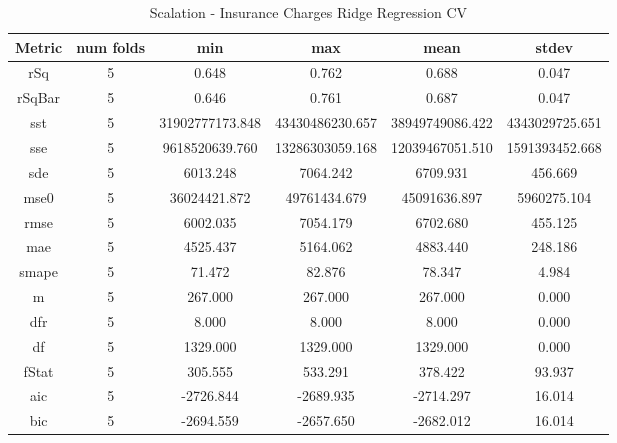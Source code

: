 \documentclass{article}
\begin{document}
\begin{table}[H]
\centering
\caption{Scalation - Insurance Charges Ridge Regression CV}
\label{tab:Scalation - Insurance Charges Ridge Regression CV}
\begin{tabular}{|c|c|c|c|c|c|}\hline
Metric & num folds & min & max & mean & stdev \\ \hline \hline
rSq & 5 & 0.648 & 0.762 & 0.688 & 0.047 \\ \hline
rSqBar & 5 & 0.646 & 0.761 & 0.687 & 0.047 \\ \hline
sst & 5 & 31902777173.848 & 43430486230.657 & 38949749086.422 & 4343029725.651 \\ \hline
sse & 5 & 9618520639.760 & 13286303059.168 & 12039467051.510 & 1591393452.668 \\ \hline
sde & 5 & 6013.248 & 7064.242 & 6709.931 & 456.669 \\ \hline
mse0 & 5 & 36024421.872 & 49761434.679 & 45091636.897 & 5960275.104 \\ \hline
rmse & 5 & 6002.035 & 7054.179 & 6702.680 & 455.125 \\ \hline
mae & 5 & 4525.437 & 5164.062 & 4883.440 & 248.186 \\ \hline
smape & 5 & 71.472 & 82.876 & 78.347 & 4.984 \\ \hline
m & 5 & 267.000 & 267.000 & 267.000 & 0.000 \\ \hline
dfr & 5 & 8.000 & 8.000 & 8.000 & 0.000 \\ \hline
df & 5 & 1329.000 & 1329.000 & 1329.000 & 0.000 \\ \hline
fStat & 5 & 305.555 & 533.291 & 378.422 & 93.937 \\ \hline
aic & 5 & -2726.844 & -2689.935 & -2714.297 & 16.014 \\ \hline
bic & 5 & -2694.559 & -2657.650 & -2682.012 & 16.014 \\ \hline
\end{tabular}
\end{table}
\end{document}
